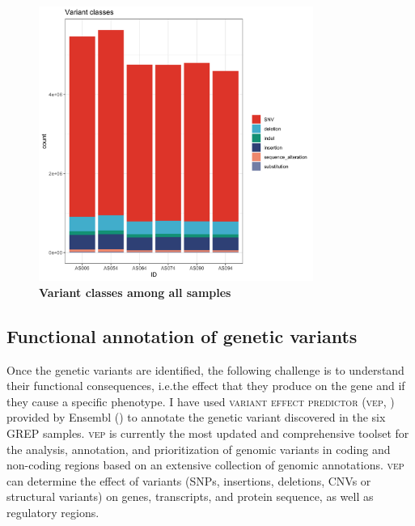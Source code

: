 \documentclass[
tikz,
11pt, %
oneside, %
english, %
singlespacing, %
headsepline, %
]{MastersDoctoralThesisV2} %
\begin{document}
\begin{figure}[H]
\centering
\includegraphics[width=0.8\textwidth]{fig/variantClass.png}
\decoRule
\caption{\textbf{Variant classes among all samples}}
\label{fig:variantClass}
\end{figure}


\subsection{Functional annotation of genetic variants}

Once the genetic variants are identified, the following challenge is to understand their functional consequences, i.e.the effect that they produce on the gene and if they cause a specific phenotype. I have used \textsc{variant effect predictor} (\textsc{vep}, \cite{mclaren2016ensembl}) provided by Ensembl (\cite{howe2020ensembl}) to annotate the genetic variant discovered in the six GREP samples. \textsc{vep} is currently the most updated and comprehensive toolset for the analysis, annotation, and prioritization of genomic variants in coding and non-coding regions based on an extensive collection of genomic annotations. \textsc{vep} can determine the effect of variants (SNPs, insertions, deletions, CNVs or structural variants) on genes, transcripts, and protein sequence, as well as regulatory regions.
\end{document}
